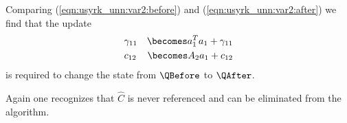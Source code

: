Comparing 
(\ref{eqn:usyrk_unn:var2:before}) and
(\ref{eqn:usyrk_unn:var2:after})
we find that the update
\begin{eqnarray*}
& \gamma_{11} & \becomes a_1^T a_1 + \gamma_{11}  \\
& c_{12} & \becomes A_2 a_1 + c_{12}
\end{eqnarray*}
is required to change the state from $ \QBefore $
to $ \QAfter $.


Again one recognizes that $ \hat{C} $ is never
referenced and can be eliminated from the algorithm.


\renewcommand{\invariant}{
\FlaTwoByTwo{ C_{TL} }       { C_{TR} }
            { \undetermined} { C_{BR} }
=
\FlaTwoByTwo{ A_{T} A_{T}^T + \hat{C}_{TL} } { A_{T} A_{B}^T + \hat{C}_{TR} }
            { \undetermined }                { \hat{C}_{BR} }
\wedge
\ldots
}

\renewcommand{\guard}{ \neg \SameSize( C, C_{TL} ) }

\renewcommand{\partitionings}{
$ 
C \rightarrow \FlaTwoByTwo{ C_{TL} }{ C_{TR} }
                          { C_{TR}^{T} }{ C_{BR} }
$
and
$
A \rightarrow \FlaTwoByOne{ A_{T} }
                          { A_{B} }
$
}
\renewcommand{\partitionsizes}{
$ C_{TL} $ and $ \hat{ C }_{TL} $ are $ 0 \times 0  $ 
and $ A_T $ has $ 0 $ rows.
}

\renewcommand{\repartitionings}{
$
\FlaTwoByTwo{ C_{TL} }{ C_{TR}}
            { \undetermined }{ C_{BR} }
\rightarrow
\FlaThreeByThreeBR{ C_{00} }  { c_{01} }  { C_{02} }
                  {\undetermined}{ \gamma_{11}}     { c_{12}^{T} }
                  { \undetermined }  { \undetermined }  { C_{22} }
,
\FlaTwoByTwo{ \hat{C}_{TL} }{ \hat{C}_{TR}}
            { \undetermined }{ \hat{C}_{BR} }
\rightarrow
\FlaThreeByThreeBR{ \hat{C}_{00} }  { \hat{c}_{01} }  { \hat{C}_{02} }
                  {\undetermined}{ \hat{\gamma}_{11}}     { \hat{c}_{12}^{T} }
                  { \undetermined }  { \undetermined }  { \hat{C}_{22} }
,
$ \\
and
$
\FlaTwoByOne{ A_{T} }
            { A_{B} }
\rightarrow
\FlaThreeByOneB{ A_{0} }
               { a_{1}^T }
               { A_{2} }
$
}
\renewcommand{\repartitionsizes}{
$ \gamma_{11} $ and $ \hat{\gamma}_{11} $ are scalars 
and $ a_1^T $ is a row.
}

\renewcommand{\moveboundaries}{%
$ 
\FlaTwoByTwo{ C_{TL} }{ C_{TR}}
            { \undetermined }{ C_{BR} }
\leftarrow
\FlaThreeByThreeTL{ C_{00} }  { c_{01} }  { C_{02} }
                  { \undetermined }{ \gamma_{11}}     { c_{12}^{T} }
                  { \undetermined }  { \undetermined }         { C_{22}}
,   
\FlaTwoByTwo{ \hat{C}_{TL} }{ \hat{C}_{TR}}
            { \undetermined }{ \hat{C}_{BR} }
\leftarrow
\FlaThreeByThreeTL{ \hat{C}_{00} }  { \hat{c}_{01} }  { \hat{C}_{02} }
                  { \undetermined }{ \hat{\gamma}_{11}}     { \hat{c}_{12}^{T}}
                  { \undetermined }  { \undetermined }      { \hat{C}_{22}},
$ \\
and
$
\FlaTwoByOne{ A_{T} }
            { A_{B} }
\leftarrow
\FlaThreeByOneT{ A_{0} }  
               { a_{1}^T }
               { A_{2} }
$
}

